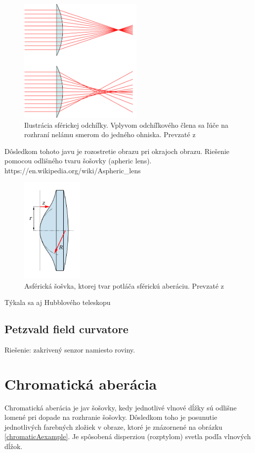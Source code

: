 \begin{figure}[h]
\centering
\label{saill}
\includegraphics[width=6cm]{obrazky-figures/sphericalAberrationWikipedia.png}
\caption{Ilustrácia sférickej odchíľky. Vplyvom odchíľkového člena sa ľúče na rozhraní nelámu smerom
    do jedného ohniska. Prevzaté z }
\end{figure}

Dôsledkom tohoto javu je rozostretie obrazu pri okrajoch obrazu.  
Riešenie pomocou odlišného tvaru šošovky (apheric lens). https://en.wikipedia.org/wiki/Aspheric\_lens

\begin{figure}[h]
\centering
\includegraphics[width=3cm]{obrazky-figures/asphericLen.png}
\caption{Asférická šošvka, ktorej tvar potláča sférickú aberáciu. Prevzaté z }
\end{figure}


Týkala sa aj Hubblového teleskopu
\subsection{Petzvald field curvatore}
Riešenie: zakrivený senzor namiesto roviny.

\section{Chromatická aberácia}
Chromatická aberácia je jav šošovky, kedy jednotlivé vlnové dĺžky sú odlišne lomené pri dopade na
rozhranie šošovky. Dôsledkom toho je posunutie jednotlivých farebných zložiek v obraze, ktoré je
znázornené na obrázku \ref{chromaticAexample}.
Je spôsobená disperziou (rozptylom) svetla podľa vlnových dĺžok.

